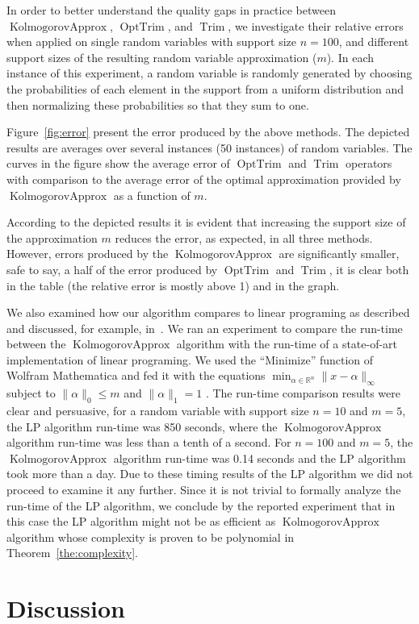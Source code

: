 \documentclass{article}
\DeclareMathOperator{\Trim}{Trim}
\DeclareMathOperator{\KlmApprox}{KolmogorovApprox}
\DeclareMathOperator{\OptTrim}{OptTrim}
\begin{document}
In order to better understand the quality gaps in practice between $\KlmApprox$, $\OptTrim$, and $\Trim$, we investigate their relative errors when applied on single random variables with support size $n = 100$, and different support sizes of the resulting random variable approximation ($m$). In each instance of this experiment, a random variable is randomly generated by choosing the probabilities of each element in the support from a uniform distribution and then normalizing these probabilities so that they sum to one.

Figure~\ref{fig:error} present the error produced by the above methods. The depicted results are averages over several instances (50 instances) of random variables. The curves in the figure show the average error of $\OptTrim$ and $\Trim$ operators with comparison to the average error of the optimal approximation provided by $\KlmApprox$ as a function of $m$.  

According to the depicted results it is evident that increasing the support size of the approximation $m$ reduces the error, as expected, in all three methods. However, errors produced by the $\KlmApprox$ are significantly smaller, safe to say, a half of the error produced by $\OptTrim$ and $\Trim$, it is clear both in the table (the relative error is mostly above 1) and in the graph.




We also examined how our algorithm compares to linear programing as described and discussed, for example, in~\cite{pavlikov2016cvar}. We ran an experiment to compare the run-time between the $\KlmApprox$ algorithm with the run-time of a state-of-art implementation of linear programing. We used the ``Minimize'' function of Wolfram Mathematica and fed it with the equations $\min_{\alpha \in \mathbb{R}^n} \| x - \alpha\|_\infty$ subject to $\|\alpha\|_0 \leq m$ and $\| \alpha \|_1 =1$ . The run-time comparison results were clear and persuasive, for a random variable with support size $n=10$ and $m=5$, the LP algorithm run-time was 850 seconds, where the $\KlmApprox$ algorithm run-time was less than a tenth of a second. For $n=100$ and $m=5$, the $\KlmApprox$ algorithm run-time was 0.14 seconds and the LP algorithm took more than a day. Due to these timing results of the LP algorithm we did not proceed to examine it any further.
Since it is not trivial to formally analyze the run-time of the LP algorithm, we conclude by the reported experiment that in this case the LP algorithm might not be as efficient as $\KlmApprox$ algorithm whose complexity is proven to be polynomial in Theorem~\ref{the:complexity}.

\section{Discussion}\label{sec:discussion}


{}

\end{document}
